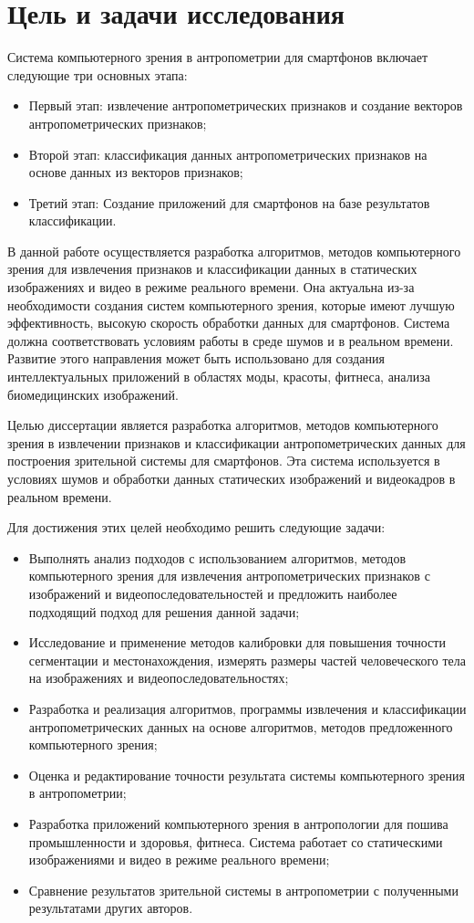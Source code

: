 \section{Цель и задачи исследования}

Система компьютерного зрения в антропометрии для смартфонов включает следующие три основных этапа:
\begin{itemize}
	\item Первый этап: извлечение антропометрических признаков и создание векторов антропометрических признаков;
	\item Второй этап: классификация данных антропометрических признаков на основе данных из векторов признаков;
	\item Третий этап: Создание приложений для смартфонов на базе результатов классификации.
\end{itemize}

В данной работе осуществляется разработка алгоритмов, методов компьютерного зрения для извлечения признаков и классификации данных в статических изображениях и видео в режиме реального времени. Она актуальна из-за необходимости создания систем компьютерного зрения, которые имеют лучшую эффективность, высокую скорость обработки данных для смартфонов. Система должна соответствовать условиям работы в среде шумов и в реальном времени. Развитие этого направления может быть использовано для создания интеллектуальных приложений в областях моды, красоты, фитнеса, анализа биомедицинских изображений.

Целью диссертации является разработка алгоритмов, методов компьютерного зрения в извлечении признаков и классификации антропометрических данных для построения зрительной системы для смартфонов. Эта система используется в условиях шумов и обработки данных статических изображений и видеокадров в реальном времени.

Для достижения этих целей необходимо решить следующие задачи:

\begin{itemize}
	\item Выполнять анализ подходов с использованием алгоритмов, методов компьютерного зрения для извлечения антропометрических признаков с изображений и видеопоследовательностей и предложить наиболее подходящий подход для решения данной задачи;
	\item Исследование и применение методов калибровки для повышения точности сегментации и местонахождения, измерять размеры частей человеческого тела на изображениях и видеопоследовательностях;
	\item Разработка и реализация алгоритмов, программы извлечения и классификации антропометрических данных на основе алгоритмов, методов предложенного компьютерного зрения;
	\item Оценка и редактирование точности результата системы компьютерного зрения в антропометрии;
	\item Разработка приложений компьютерного зрения в антропологии для пошива промышленности и здоровья, фитнеса. Система работает со статическими изображениями и видео в режиме реального времени;
	\item Сравнение результатов зрительной системы в антропометрии с полученными результатами других авторов.
\end{itemize}